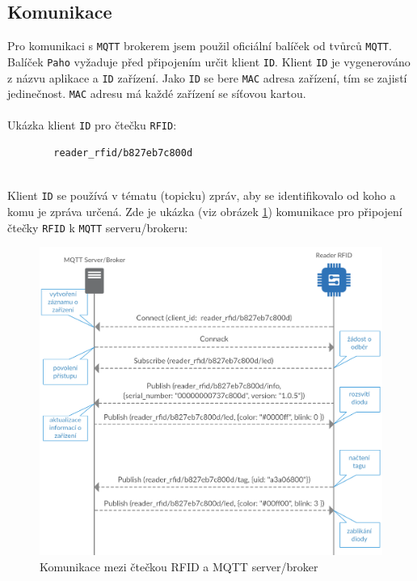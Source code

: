 \documentclass[czech,BP]{thesiskiv}
\begin{document}
	\subsection{Komunikace}
	Pro komunikaci s \texttt{MQTT} brokerem jsem použil oficiální balíček od tvůrců \texttt{MQTT}.
	Balíček \texttt{Paho} vyžaduje před připojením určit klient \texttt{ID}.
	Klient \texttt{ID} je vygenerováno z názvu aplikace a \texttt{ID} zařízení. 
	Jako \texttt{ID} se bere \texttt{MAC} adresa zařízení, tím se zajistí jedinečnost. \texttt{MAC} adresu má každé zařízení se síťovou kartou.
	\\\\
	Ukázka klient \texttt{ID} pro čtečku \texttt{RFID}:
	\begin{verbatim}
		reader_rfid/b827eb7c800d
	\end{verbatim}		
	\ \\
	Klient \texttt{ID} se používá v tématu (topicku) zpráv, aby se identifikovalo od koho a komu je zpráva určená.		
	Zde je ukázka (viz obrázek \ref{fig:mqtt_communication}) komunikace pro připojení čtečky \texttt{RFID} k \texttt{MQTT} serveru/brokeru:	
	\begin{figure}[H]
		\centering
		\includegraphics[width=\textwidth]{../diagrams/mqtt_communication.png}	
		\caption{Komunikace mezi čtečkou RFID a MQTT server/broker}
		\label{fig:mqtt_communication}
	\end{figure}
\end{document}

